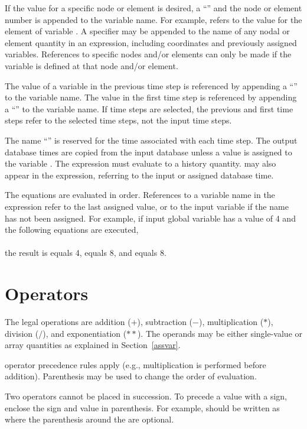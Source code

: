 If the value for a specific node or element is desired, a ``\cmd{\$}''
and the node or element number is appended to the variable name. For
example,  refers to the value for the  element
of variable . A specifier may be appended to the name of any
nodal or element quantity in an expression, including coordinates and
previously assigned variables. References to specific nodes and/or
elements can only be made if the variable is defined at that node and/or
element.

The value of a variable in the previous time step is referenced by
appending a ``\cmd{:}'' to the variable name. The value in the first
time step is referenced by appending a ``'' to the variable
name. If time steps are selected, the previous and first time steps
refer to the selected time steps, not the input time steps.

The name ``'' is reserved for the time associated with each
time step. The output database times are copied from the input database
unless a value is assigned to the variable . The 
expression must evaluate to a history quantity.  may also
appear in the expression, referring to the input or assigned database
time.

The equations are evaluated in order. References to a variable name in
the expression refer to the last assigned value, or to the input
variable if the name has not been assigned. For example, if input global
variable  has a value of 4 and the following equations are
executed,
\cenlinesbegin
{} \\
 \\
\cenlinesend
the result is  equals 4,  equals 8, and  equals
8.

\section{Operators}

The legal operations are addition ($+$), subtraction ($-$),
multiplication ($*$), division ($/$), and exponentiation ($**$). The
operands may be either single-value or array quantities as explained in
Section~\ref{assvar}.

 operator precedence rules apply (e.g., multiplication is
performed before addition). Parenthesis may be used to change the order
of evaluation.

Two operators cannot be placed in succession. To precede a value with a
sign, enclose the sign and value in parenthesis. For example,
\cenlinesbegin
{}
\cenlinesend
should be written as
\cenlinesbegin
{}
\cenlinesend
where the parenthesis around the  are optional.

